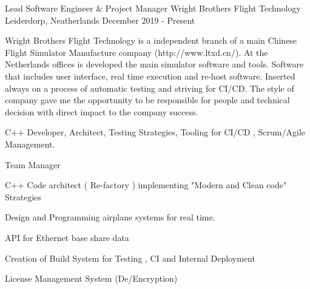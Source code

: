 \begin{cventries}
    \cventry
    {Lead Software Engineer \& Project Manager}
    {Wright Brothers Flight Technology}
    {Leiderdorp, Neatherlands}
    {December 2019 - Present}
    {    
     Wright Brothers Flight Technology is a independent branch of a main Chinese Flight Simulator Manufacture company (http://www.ltxd.cn/).\newline
     At the Netherlands offices is developed the main simulator software and tools. Software that includes user interface, real time execution and re-host software. Inserted always on a process of automatic testing and striving for CI/CD.\newline
     The style of company gave me the opportunity to be responsible for people and technical decision with direct impact to the company success.\newline
     \begin{cvparagraph}
     \vspace{2mm}
      C++ Developer, Architect, Testing Strategies, Tooling for CI/CD ,
     Scrum/Agile Management.\newline 
     \end{cvparagraph}
     \begin{cvparagraph}
      \vspace{5mm}
        \begin{cvitems}
        \item Team Manager
        \item C++ Code architect ( Re-factory ) implementing "Modern and Clean code" Strategies 
        \item Design and Programming airplane systems for real time.
        \item API for Ethernet base share data
        \item Creation of Build System for Testing , CI and Internal Deployment
        \item License Management System (De/Encryption)
        \end{cvitems}
    \end{cvparagraph}
    }
  

\end{cventries}
